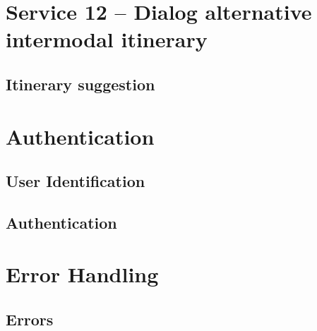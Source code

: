 \section{Service 12 -- Dialog alternative intermodal itinerary}
\label{sec:Datenmodell:Dienst12}

\subsection*{Itinerary suggestion}



\section{Authentication}
\label{sec:Datenmodell:Auth}

\subsection*{User Identification}



\subsection*{Authentication}



\section{Error Handling}
\subsection*{Errors}


